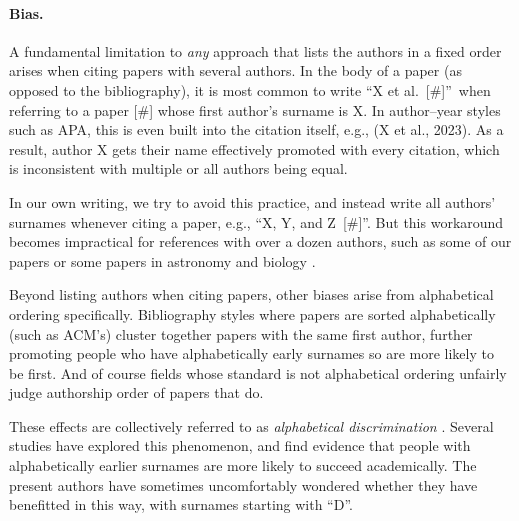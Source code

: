 \documentclass[natbib,authoryear]{sigtbd17-style}
\begin{document}
\paragraph{Bias.}

A fundamental limitation to \emph{any} approach that lists the authors
in a fixed order arises when citing papers with several authors.
In the body of a paper (as opposed to the bibliography), it is most common
to write ``X et al.~[\#]''\ when referring to a paper [\#]
whose first author's surname is X.
In author--year styles such as APA, this is even built into the citation
itself, e.g., (X et al., 2023).
As a result, author X gets their name effectively promoted with every citation,
which is inconsistent with multiple or all authors being equal.

In our own writing, we try to avoid this practice, and instead
write all authors' surnames whenever citing a paper,
e.g., ``X, Y, and Z~[\#]''.
But this workaround becomes impractical for references with over a dozen
authors, such as some of our papers
\cite{ArithmeticGames_ISAAC2020,LessThanEdgeMatching_JIP}
or some papers in astronomy \cite{reverse-alphabetical} and
biology \cite{human-genome}.

Beyond listing authors when citing papers,
other biases arise from alphabetical ordering specifically.
Bibliography styles where papers are sorted alphabetically (such as ACM's)
cluster together papers with the same first author, further promoting people
who have alphabetically early surnames so are more likely to be first.
And of course fields whose standard is not alphabetical ordering
unfairly judge authorship order of papers that do.

These effects are collectively referred to as
\emph{alphabetical discrimination} \cite{alphabetical-discrimination}.
Several studies have explored this phenomenon, and find evidence that
people with alphabetically earlier surnames are more likely to succeed
academically.
The present authors have sometimes uncomfortably wondered whether they have
benefitted in this way, with surnames starting with ``D''.
\end{document}
